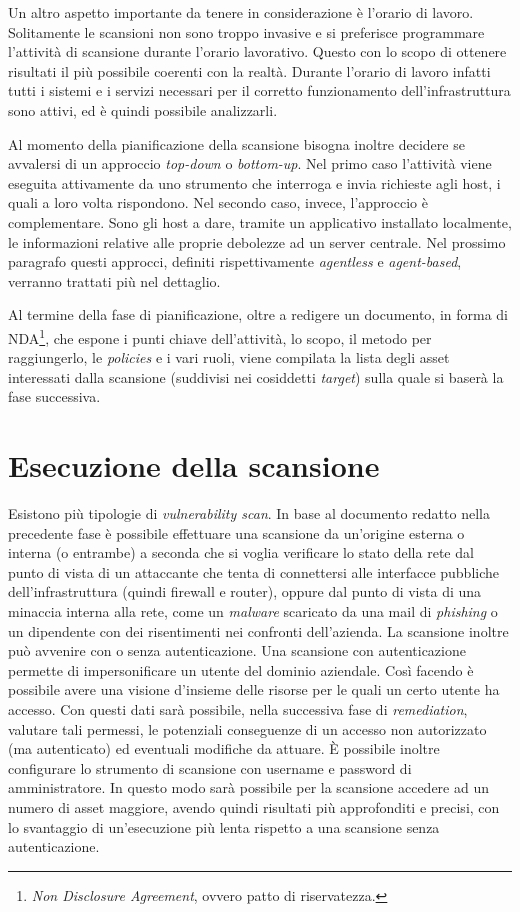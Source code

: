 \documentclass[target=bach,aauheader=]{thud}
\begin{document}
Un altro aspetto importante da tenere in considerazione è l’orario di lavoro. Solitamente le scansioni non sono troppo invasive e si preferisce programmare l'attività di scansione durante l'orario lavorativo. Questo con lo scopo di ottenere risultati il più possibile coerenti con la realtà. Durante l'orario di lavoro infatti tutti i sistemi e i servizi necessari per il corretto funzionamento dell'infrastruttura sono attivi, ed è quindi possibile analizzarli.

Al momento della pianificazione della scansione bisogna inoltre decidere se avvalersi di un approccio \textit{top-down} o \textit{bottom-up}. Nel primo caso l’attività viene eseguita attivamente da uno strumento che interroga e invia richieste agli host, i quali a loro volta rispondono. Nel secondo caso, invece, l’approccio è complementare. Sono gli host a dare, tramite un applicativo installato localmente, le informazioni relative alle proprie debolezze ad un server centrale. Nel prossimo paragrafo questi approcci, definiti rispettivamente \textit{agentless} e \textit{agent-based}, verranno trattati più nel dettaglio.

Al termine della fase di pianificazione, oltre a redigere un documento, in forma di NDA\footnote{\textit{Non Disclosure Agreement}, ovvero patto di riservatezza.}, che espone i punti chiave dell’attività, lo scopo, il metodo per raggiungerlo, le \textit{policies} e i vari ruoli, viene compilata la lista degli asset interessati dalla scansione (suddivisi nei cosiddetti \textit{target}) sulla quale si baserà la fase successiva.


\section{Esecuzione della scansione}
Esistono più tipologie di \textit{vulnerability scan}. In base al documento redatto nella precedente fase è possibile effettuare una scansione da un’origine esterna o interna (o entrambe) a seconda che si voglia verificare lo stato della rete dal punto di vista di un attaccante che tenta di connettersi alle interfacce pubbliche dell’infrastruttura (quindi firewall e router), oppure dal punto di vista di una minaccia interna alla rete, come un \textit{malware} scaricato da una mail di \textit{phishing} o un dipendente con dei risentimenti nei confronti dell’azienda. La scansione inoltre può avvenire con o senza autenticazione. Una scansione con autenticazione permette di impersonificare un utente del dominio aziendale. Così facendo è possibile avere una visione d’insieme delle risorse per le quali un certo utente ha accesso. Con questi dati sarà possibile, nella successiva fase di \textit{remediation}, valutare tali permessi, le potenziali conseguenze di un accesso non autorizzato (ma autenticato) ed eventuali modifiche da attuare. È possibile inoltre configurare lo strumento di scansione con username e password di amministratore. In questo modo sarà possibile per la scansione accedere ad un numero di asset maggiore, avendo quindi risultati più approfonditi e precisi, con lo svantaggio di un’esecuzione più lenta rispetto a una scansione senza autenticazione.
\end{document}
